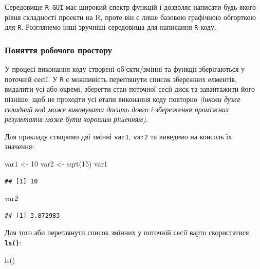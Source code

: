 \documentclass[
]{book}
\newenvironment{Shaded}{\begin{snugshade}}{\end{snugshade}}
\newcommand{\DecValTok}[1]{\textcolor[rgb]{0.00,0.00,0.81}{#1}}
\newcommand{\FunctionTok}[1]{\textcolor[rgb]{0.00,0.00,0.00}{#1}}
\newcommand{\NormalTok}[1]{#1}
\newcommand{\OtherTok}[1]{\textcolor[rgb]{0.56,0.35,0.01}{#1}}
\begin{document}
Середовище \texttt{R\ GUI} має широкий спектр функцій і дозволяє написати будь-якого рівня складності проекти на R, проте він є лише базовою графічною обгорткою для \texttt{R}. Розглянемо інші зручніші середовища для написання \texttt{R}-коду.

\hypertarget{chapter1313}{%
\subsubsection{Поняття робочого простору}\label{chapter1313}}

У процесі виконання коду створені об'єкти/змінні та функції зберігаються у поточній сесії. У \texttt{R} є можливість переглянути список збережних елментів, видалити усі або окремі, зберегти стан поточної сесії диск та завантажити його пізніше, щоб не проходти усі етапи виконання коду повторно \emph{(інколи дуже складний код може виконувати досить довго і збереження проміжних результатів може бути хорошим рішенням)}.

Для прикладу створимо дві змінні \texttt{var1}, \texttt{var2} та виведемо на консоль їх значення:

\begin{Shaded}
\begin{Highlighting}[]
\NormalTok{var1 }\OtherTok{\textless{}{-}} \DecValTok{10}
\NormalTok{var2 }\OtherTok{\textless{}{-}} \FunctionTok{sqrt}\NormalTok{(}\DecValTok{15}\NormalTok{)}
\NormalTok{var1}
\end{Highlighting}
\end{Shaded}

\begin{verbatim}
## [1] 10
\end{verbatim}

\begin{Shaded}
\begin{Highlighting}[]
\NormalTok{var2}
\end{Highlighting}
\end{Shaded}

\begin{verbatim}
## [1] 3.872983
\end{verbatim}

Для того аби переглянути список змінних у поточній сесії варто скористатися \textbf{\texttt{ls()}}:

\begin{Shaded}
\begin{Highlighting}[]
\FunctionTok{ls}\NormalTok{()}
\end{Highlighting}
\end{Shaded}
\end{document}
